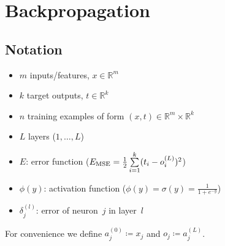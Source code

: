 \section{Backpropagation}\label{sec:backpropagation}

\subsection{Notation}
\begin{itemize}
\item $m$ inputs/features, $x \in \mathbb{R}^m$
\item $k$ target outputs, $t \in \mathbb{R}^k$
\item $n$ training examples of form $(x, t) \in \mathbb{R}^m \times \mathbb{R}^k$
\item $L$ layers ($1,\dots,L$)
\item $E$: error function (\eg $E_\text{MSE} = \frac{1}{2} \sum\limits_{i=1}^k (t_i - o_i^{(L)})^2$)
\item $\phi(y)$: activation function (\eg $\phi(y) = \sigma(y) = \frac{1}{1 + e^{-y}}$)
\item $\delta_j^{(l)}$: error of neuron~$j$ in layer~$l$
\end{itemize}

For convenience we define $a_j^{(0)}\coloneqq x_j$ and $o_j\coloneqq a_j^{(L)}$.

